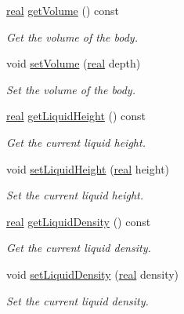 \begin{DoxyCompactItemize}
\mbox{\hyperlink{namespacer3_ab2016b3e3f743fb735afce242f0dc1eb}{real}} \mbox{\hyperlink{classr3_1_1_particle_buoyancy_a071ee55cf3413806e11445956bbcda0c}{get\+Volume}} () const
\begin{DoxyCompactList}\small\item\em Get the volume of the body. \end{DoxyCompactList}\item 
void \mbox{\hyperlink{classr3_1_1_particle_buoyancy_acd41f54ee680a742284a7b5473935e19}{set\+Volume}} (\mbox{\hyperlink{namespacer3_ab2016b3e3f743fb735afce242f0dc1eb}{real}} depth)
\begin{DoxyCompactList}\small\item\em Set the volume of the body. \end{DoxyCompactList}\item 
\mbox{\hyperlink{namespacer3_ab2016b3e3f743fb735afce242f0dc1eb}{real}} \mbox{\hyperlink{classr3_1_1_particle_buoyancy_ab60350b1a4fe78771b8fd1d145aa6bf1}{get\+Liquid\+Height}} () const
\begin{DoxyCompactList}\small\item\em Get the current liquid height. \end{DoxyCompactList}\item 
void \mbox{\hyperlink{classr3_1_1_particle_buoyancy_a3be640435a5aea5d851b793bfa0228f9}{set\+Liquid\+Height}} (\mbox{\hyperlink{namespacer3_ab2016b3e3f743fb735afce242f0dc1eb}{real}} height)
\begin{DoxyCompactList}\small\item\em Set the current liquid height. \end{DoxyCompactList}\item 
\mbox{\hyperlink{namespacer3_ab2016b3e3f743fb735afce242f0dc1eb}{real}} \mbox{\hyperlink{classr3_1_1_particle_buoyancy_a075809e6cbced13f164cbcdcf50e04fc}{get\+Liquid\+Density}} () const
\begin{DoxyCompactList}\small\item\em Get the current liquid density. \end{DoxyCompactList}\item 
void \mbox{\hyperlink{classr3_1_1_particle_buoyancy_a9394f89ca96484706c8fe3fc95a57b0c}{set\+Liquid\+Density}} (\mbox{\hyperlink{namespacer3_ab2016b3e3f743fb735afce242f0dc1eb}{real}} density)
\begin{DoxyCompactList}\small\item\em Set the current liquid density. \end{DoxyCompactList}\item 

\end{DoxyCompactItemize}
